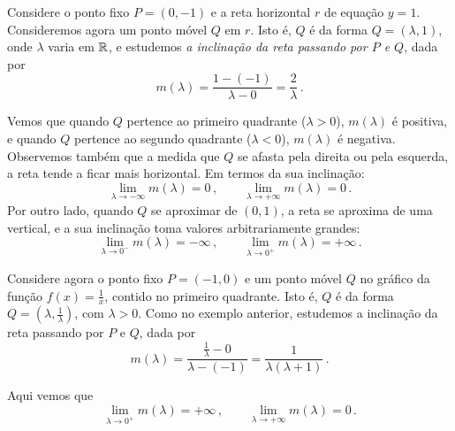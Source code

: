 \begin{ex}
Considere o ponto {fixo} $P=(0,-1)$ e a reta horizontal $r$ de
equação $y=1$. Consideremos agora um ponto móvel $Q$ em $r$. Isto é, $Q$ 
é da forma
$Q=(\lambda,1)$, onde $\lambda$ varia em $\mathbb{R}$, e estudemos
\emph{a inclinação da reta passando por $P$ e $Q$}, dada por 
$$m(\lambda)=\frac{1-(-1)}{\lambda-0}=\frac{2}{\lambda}\,.$$
\begin{center}
\begin{bmlimage}\end{bmlimage}
\end{center}
Vemos que quando $Q$ pertence ao primeiro quadrante ($\lambda>0$),
$m(\lambda)$ é positiva, e quando $Q$ pertence ao segundo quadrante
($\lambda<0$), $m(\lambda)$ é negativa.
Observemos também que a
medida que $Q$ se afasta pela direita ou pela esquerda, a reta tende a ficar
mais
horizontal. Em termos da sua inclinação: 
$$\lim_{\lambda\to-\infty}m(\lambda)=0\,,\quad
\quad\lim_{\lambda\to +\infty}m(\lambda)=0\,.$$
Por outro lado, quando $Q$ se aproximar de $(0,1)$, a reta se aproxima
de uma vertical, e a sua inclinação toma valores
arbitrariamente grandes:
$$\lim_{\lambda\to 0^-}m(\lambda)=-\infty\,,\quad \quad\lim_{\lambda\to
0^+}m(\lambda)=+\infty\,.$$
\end{ex}


\begin{ex}
Considere agora o ponto fixo $P=(-1,0)$ e um
ponto móvel $Q$ no gráfico da função $f(x)=\frac1x$, contido no primeiro
quadrante. Isto é,
$Q$ é da forma $Q=(\lambda,\frac{1}{\lambda})$, com $\lambda>0$. Como no
exemplo anterior, 
estudemos {a inclinação da reta passando por $P$ e $Q$},
dada por 
$$m(\lambda)=\frac{\frac{1}{\lambda}-0}{\lambda-(-1)}=\frac{1}{
\lambda(\lambda+1)}\,.$$
\begin{center}
\begin{bmlimage}\end{bmlimage}
\end{center}
Aqui vemos que 
$$\lim_{\lambda\to 0^+}m(\lambda)=+\infty\,,\quad \quad\lim_{\lambda\to
+\infty}m(\lambda)=0\,.$$
\end{ex}

